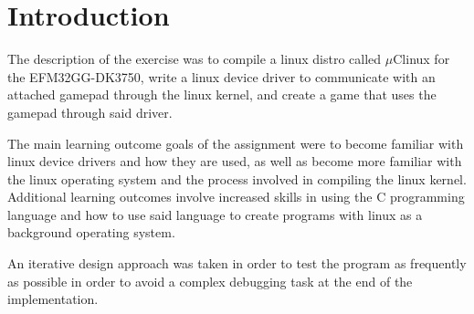 \section{Introduction}

The description of the exercise was to compile a linux distro called $\mu$Clinux for the EFM32GG-DK3750, write a linux device driver to communicate with an attached gamepad through the linux kernel, and create a game that uses the gamepad through said driver.

The main learning outcome goals of the assignment were to become familiar with linux device drivers and how they are used, as well as become more familiar with the linux operating system and the process involved in compiling the linux kernel. Additional learning outcomes involve increased skills in using the C programming language and how to use said language to create programs with linux as a background operating system.

An iterative design approach was taken in order to test the program as frequently as possible in order to avoid a complex debugging task at the end of the implementation.






